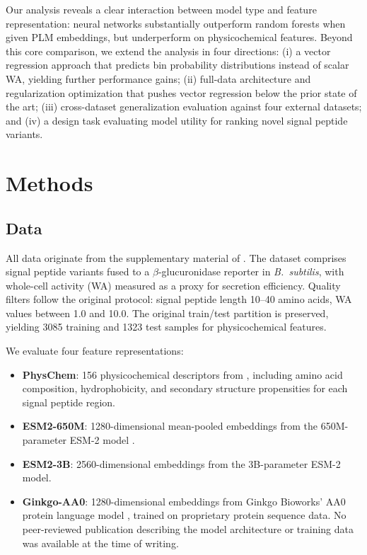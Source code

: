 \documentclass[12pt]{article}
\begin{document}
Our analysis reveals a clear interaction between model type and feature representation: neural networks substantially outperform random forests when given PLM embeddings, but underperform on physicochemical features.
Beyond this core comparison, we extend the analysis in four directions: (i) a vector regression approach that predicts bin probability distributions instead of scalar WA, yielding further performance gains; (ii) full-data architecture and regularization optimization that pushes vector regression below the prior state of the art; (iii) cross-dataset generalization evaluation against four external datasets; and (iv) a design task evaluating model utility for ranking novel signal peptide variants.

\section{Methods}
\label{sec:methods}

\subsection{Data}
\label{sec:data}

All data originate from the supplementary material of \citet{grasso2023}.
The dataset comprises signal peptide variants fused to a $\beta$-glucuronidase reporter in \textit{B.\ subtilis}, with whole-cell activity (WA) measured as a proxy for secretion efficiency.
Quality filters follow the original protocol: signal peptide length 10--40 amino acids, WA values between 1.0 and 10.0.
The original train/test partition is preserved, yielding 3085 training and 1323 test samples for physicochemical features.

We evaluate four feature representations:
\begin{itemize}
    \item \textbf{PhysChem}: 156 physicochemical descriptors from \citet{grasso2023}, including amino acid composition, hydrophobicity, and secondary structure propensities for each signal peptide region.
    \item \textbf{ESM2-650M}: 1280-dimensional mean-pooled embeddings from the 650M-parameter ESM-2 model \citep{lin2023}.
    \item \textbf{ESM2-3B}: 2560-dimensional embeddings from the 3B-parameter ESM-2 model.
    \item \textbf{Ginkgo-AA0}: 1280-dimensional embeddings from Ginkgo Bioworks' AA0 protein language model \citep{ginkgo2024}, trained on proprietary protein sequence data.
    No peer-reviewed publication describing the model architecture or training data was available at the time of writing.
\end{itemize}
\end{document}
